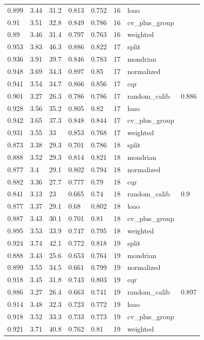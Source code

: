 \begin{tabular}{llllllll}
0.899 & 3.44 & 31.2 & 0.813 & 0.752 & 16 & loao &  \\
0.91 & 3.51 & 32.8 & 0.849 & 0.786 & 16 & cv\_plus\_group &  \\
0.89 & 3.46 & 31.4 & 0.797 & 0.763 & 16 & weighted &  \\
0.953 & 3.83 & 46.3 & 0.886 & 0.822 & 17 & split &  \\
0.936 & 3.91 & 39.7 & 0.846 & 0.783 & 17 & mondrian &  \\
0.948 & 3.69 & 34.3 & 0.897 & 0.85 & 17 & normalized &  \\
0.941 & 3.54 & 34.7 & 0.866 & 0.856 & 17 & cqr &  \\
0.901 & 3.27 & 26.3 & 0.786 & 0.786 & 17 & random\_calib & 0.886 \\
0.928 & 3.56 & 35.2 & 0.805 & 0.82 & 17 & loao &  \\
0.942 & 3.65 & 37.3 & 0.848 & 0.844 & 17 & cv\_plus\_group &  \\
0.931 & 3.55 & 33 & 0.853 & 0.768 & 17 & weighted &  \\
0.873 & 3.38 & 29.3 & 0.701 & 0.786 & 18 & split &  \\
0.888 & 3.52 & 29.3 & 0.814 & 0.821 & 18 & mondrian &  \\
0.877 & 3.4 & 29.1 & 0.802 & 0.794 & 18 & normalized &  \\
0.882 & 3.36 & 27.7 & 0.777 & 0.79 & 18 & cqr &  \\
0.841 & 3.13 & 23 & 0.665 & 0.74 & 18 & random\_calib & 0.9 \\
0.877 & 3.37 & 29.1 & 0.68 & 0.802 & 18 & loao &  \\
0.887 & 3.43 & 30.1 & 0.701 & 0.81 & 18 & cv\_plus\_group &  \\
0.895 & 3.53 & 33.9 & 0.747 & 0.795 & 18 & weighted &  \\
0.924 & 3.74 & 42.1 & 0.772 & 0.818 & 19 & split &  \\
0.888 & 3.43 & 25.6 & 0.653 & 0.764 & 19 & mondrian &  \\
0.899 & 3.55 & 34.5 & 0.661 & 0.799 & 19 & normalized &  \\
0.918 & 3.45 & 31.8 & 0.743 & 0.803 & 19 & cqr &  \\
0.886 & 3.27 & 26.4 & 0.663 & 0.741 & 19 & random\_calib & 0.897 \\
0.914 & 3.48 & 32.3 & 0.723 & 0.772 & 19 & loao &  \\
0.918 & 3.52 & 33.3 & 0.733 & 0.773 & 19 & cv\_plus\_group &  \\
0.921 & 3.71 & 40.8 & 0.762 & 0.81 & 19 & weighted &  \\
\bottomrule
\end{tabular}